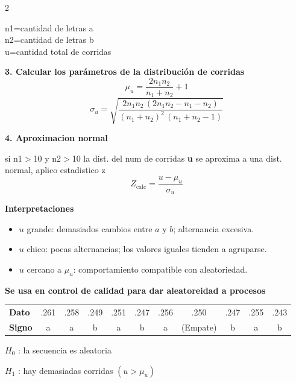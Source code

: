 \documentclass[12pt,a4paper,landscape]{article}
\newenvironment{sangria}{\begin{list}{}{\setlength{\leftmargin}{16pt}\setlength{\rightmargin}{0pt}\setlength{\itemindent}{0pt}\setlength{\listparindent}{0pt}\setlength{\topsep}{2pt}\setlength{\parsep}{4pt}}\item[]}{\end{list}}
\begin{document}
\begin{multicols}{2}
\begin{minipage}{\linewidth}
\begin{sangria}
n1=cantidad de letras a\\
n2=cantidad de letras b\\
u=cantidad total de corridas
\end{sangria}
\end{minipage}

\textbf{3. Calcular los parámetros de la distribución de corridas}
\[
\mu_u = \frac{2n_1 n_2}{n_1+n_2} + 1
\]
\[
\sigma_u = \sqrt{\frac{2n_1 n_2\,(2n_1 n_2 - n_1 - n_2)}{(n_1+n_2)^2\,(n_1+n_2-1)}}
\]

\textbf{4. Aproximacion normal}

\begin{sangria}
si n1$>$10 y n2$>$10 la dist. del num de corridas \textbf{u} se aproxima a una dist. normal, aplico estadistico z
\[
Z_{\text{calc}} = \frac{u - \mu_u}{\sigma_u}
\]
\end{sangria}

\textbf{Interpretaciones}

\begin{itemize}[leftmargin=20pt,itemsep=4pt,topsep=3pt,parsep=0pt]
  \item {\small $u$ grande: demasiados cambios entre $a$ y $b$; alternancia excesiva.}
  \item {\small $u$ chico: pocas alternancias; los valores iguales tienden a agruparse.}
  \item {\small $u$ cercano a $\mu_u$: comportamiento compatible con aleatoriedad.}
\end{itemize}

\textbf{Se usa en control de calidad para dar aleatoreidad a procesos}

\vspace{4pt}
\begin{center}
{\small
\setlength{\tabcolsep}{4.2pt}
\begin{tabular}{l c c c c c c c c c c}
\toprule
\textbf{Dato} & .261 & .258 & .249 & .251 & .247 & .256 & .250 & .247 & .255 & .243 \\
\textbf{Signo} & a & a & b & a & b & a & {\footnotesize (Empate)} & b & a & b \\
\bottomrule
\end{tabular}
}
\end{center}

$H_0$ : la secuencia es aleatoria

$H_1$ : hay demasiadas corridas $(u > \mu_u)$

\end{multicols}
\end{document}
